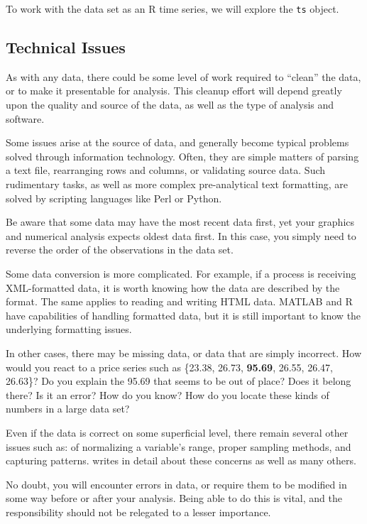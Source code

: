 To work with the data set as an R time series, we will explore the \texttt{ts} object. 

\pagebreak
\subsection{Technical Issues}
As with any data, there could be some level of work required to ``clean'' the data, or to make it presentable for analysis.  This cleanup effort will depend greatly upon the quality and source of the data, as well as the type of analysis and software.

Some issues arise at the source of \fts{} data, and generally become typical problems solved through information technology. Often, they are simple matters of parsing a text file, rearranging rows and columns, or validating source data. Such rudimentary tasks, as well as more complex pre-analytical text formatting, are solved by scripting languages like Perl or Python.

Be aware that some \fts{} data may have the most recent data first, yet your graphics and numerical analysis expects oldest data first. In this case, you simply need to reverse the order of the observations in the data set.

Some data conversion is more complicated. For example, if a process is receiving XML-formatted data, it is worth knowing how the data are described by the format. The same applies to reading and writing HTML data. MATLAB and R have capabilities of handling formatted data, but it is still important to know the underlying formatting issues.

In other cases, there may be missing data, or data that are simply incorrect. How would you react to a price series such as \{23.38, 26.73, \textbf{95.69}, 26.55, 26.47, 26.63\}? Do you explain the 95.69 that seems to be out of place? Does it belong there? Is it an error? How do you know? How do you locate these kinds of numbers in a large data set?

Even if the data is correct on some superficial level, there remain several other issues such as: of normalizing a variable's range, proper sampling methods, and capturing patterns.  writes in detail about these concerns as well as many others.

No doubt, you will encounter errors in data, or require them to be modified in some way before or after your analysis. Being able to do this is vital, and the responsibility should not be relegated to a lesser importance.